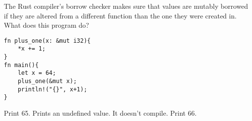 %
%
The Rust compiler's borrow checker makes sure that values are mutably borrowed if they are altered from a different function than the one they were created in. What does this program do?
\begin{lstlisting}
fn plus_one(x: &mut i32){
    *x += 1;
}
fn main(){
    let x = 64;
    plus_one(&mut x);
    println!("{}", x+1);
}
\end{lstlisting}
  \choice Print 65.
  \choice Prints an undefined value.
  \choice It doesn't compile.
  \choice Print 66.
